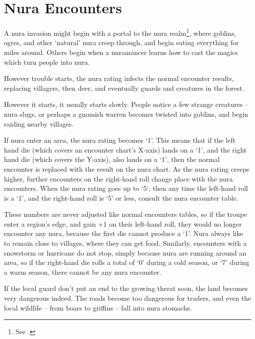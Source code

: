 \section{Nura Encounters}

\begin{multicols}{2}

\noindent
A nura invasion might begin with a portal to the nura realm\footnote{See .}, where goblins, ogres, and other `natural' nura creep through, and begin eating everything for miles around.
Others begin when a nuramancer learns how to cast the magics which turn people into nura.

However trouble starts, the nura rating infects the normal encounter results, replacing villagers, then deer, and eventually \glspl{guard} and creatures in the forest.

However it starts, it usually starts slowly.
People notice a few strange creatures -- nura slugs, or perhaps a gnomish warren becomes twisted into goblins, and begin raiding nearby villages.

If nura enter an area, the nura rating becomes `1'.
This means that if the left hand die (which covers an encounter chart's X-axis) lands on a `1', and the right hand die (which covers the Y-axis), also lands on a `1', then the normal encounter is replaced with the result on the nura chart.
As the nura rating creeps higher, further encounters on the right-hand roll change place with the nura encounters.
When the nura rating goes up to `5`, then any time the left-hand roll is a `1', and the right-hand roll is `5' or less, consult the nura encounter table.

These numbers are never adjusted like normal encounters tables, so if the troupe enter a region's \gls{edge}, and gain +1 on their left-hand roll, they would no longer encounter any nura, because the first die cannot produce a `1'.
Nura always like to remain close to villages, where they can get food.
Similarly, encounters with a snowstorm or hurricane do not stop, simply because nura are running around an area, so if the right-hand die rolls a total of `0' during a cold season, or `7' during a warm season, there cannot be any nura encounter.

If the local \gls{guard} don't put an end to the growing threat soon, the land becomes very dangerous indeed.
The roads become too dangerous for traders, and even the local wildlife -- from boars to griffins -- fall into nura stomachs.


\end{multicols}
